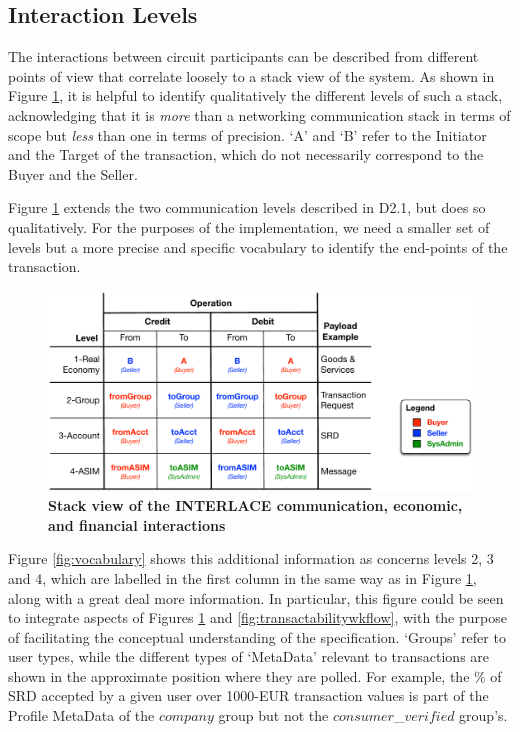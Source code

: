 \subsection{Interaction Levels}
\label{sec:intlevels}
The interactions between circuit participants can be described from different points of view that correlate loosely to a stack view of the system. As shown in Figure \ref{fig:stack}, it is helpful to identify qualitatively the different levels of such a stack, acknowledging that it is \emph{more} than a networking communication stack in terms of scope but \emph{less} than one in terms of precision. `A' and `B' refer to the Initiator and the Target of the transaction, which do not necessarily correspond to the Buyer and the Seller.

Figure \ref{fig:stack} extends the two communication levels described in D2.1, but does so qualitatively. For the purposes of the implementation, we need a smaller set of levels but a more precise and specific vocabulary to identify the end-points of the transaction.

\begin{figure}[H]
\centering
\includegraphics[width=16cm]{Figures/Stack}
\caption{\small\textbf{Stack view of the INTERLACE communication, economic, and financial  interactions}}
\label{fig:stack}
\vspace{-0.5cm}
\end{figure}

Figure \ref{fig:vocabulary} shows this additional information as concerns levels 2, 3 and 4, which are labelled in the first column in the same way as in Figure \ref{fig:stack}, along with a great deal more information. In particular, this figure could be seen to integrate aspects of Figures \ref{fig:stack} and \ref{fig:transactabilitywkflow}, with the purpose of facilitating the conceptual understanding of the specification. `Groups' refer to user types, while the different types of `MetaData' relevant to transactions are shown in the approximate position where they are polled. For example, the $\%$ of SRD accepted by a given user over 1000-EUR transaction values is part of the Profile MetaData of the $company$ group but not the $consumer$\_$verified$ group's.

